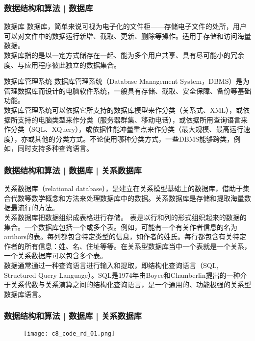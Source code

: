 \begin{frame}
  \frametitle{数据结构和算法 | 数据库}
  \vspace{-0.5em}
  \begin{block}{数据库}
    数据库，简单来说可视为电子化的文件柜——存储电子文件的处所，用户可以对文件中的数据运行新增、截取、更新、删除等操作。适用于存储和访问海量数据。\\
    \vspace{0.2em}
    数据库指的是以一定方式储存在一起、能为多个用户共享、具有尽可能小的冗余度、与应用程序彼此独立的数据集合。
  \end{block}
  \pause
  \vspace{-0.5em}
  \begin{block}{数据库管理系统}
    数据库管理系统（Database Management System，DBMS）是为管理数据库而设计的电脑软件系统，一般具有存储、截取、安全保障、备份等基础功能。\\
    \vspace{0.1em}
数据库管理系统可以依据它所支持的数据库模型来作分类（关系式、XML），或依据所支持的电脑类型来作分类（服务器群集、移动电话），或依据所用查询语言来作分类（SQL、XQuery），或依据性能冲量重点来作分类（最大规模、最高运行速度），亦或其他的分类方式。不论使用哪种分类方式，一些DBMS能够跨类，例如，同时支持多种查询语言。
  \end{block}
\end{frame}

\begin{frame}
  \frametitle{数据结构和算法 | 数据库 | 关系数据库}
关系数据库（relational database），是建立在关系模型基础上的数据库，借助于集合代数等数学概念和方法来处理数据库中的数据。\alert{关系数据库是存储和提取海量数据最流行的方法。}\\
\vspace{1em}
\alert{关系数据库把数据组织成表格进行存储。} 表是以\alert{行和列的形式}组织起来的数据的集合。一个数据库包括一个或多个表。例如，可能有一个有关作者信息的名为authors的表。每列都包含特定类型的信息，如作者的姓氏。每行都包含有关特定作者的所有信息：姓、名、住址等等。在关系型数据库当中一个表就是一个关系，一个关系数据库可以包含多个表。\\
\vspace{1em}
数据通常通过一种查询语言进行输入和提取，即\alert{结构化查询语言（SQL, Structured Query Language）}。SQL是1974年由Boyce和Chamberlin提出的一种介于关系代数与关系演算之间的结构化查询语言，是一个通用的、功能极强的关系型数据库语言。
\end{frame}

\begin{frame}
  \frametitle{数据结构和算法 | 数据库 | 关系数据库}
  \begin{figure}
    \centering
    \texttt{[image: c8\_code\_rd\_01.png]}
  \end{figure}
\end{frame}


